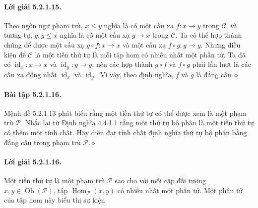 \paragraph{Lời giải 5.2.1.15.} Theo ngôn ngữ phạm trù, $x\leq y$ nghĩa là có một cấu xạ $f:x\to y$ trong $\mathcal C$, và tương tự, $g:y\leq x$ nghĩa là có một cấu xạ $y\to x$ trong $\mathcal C$. Ta có thể hợp thành chúng để được một cấu xạ $g\circ f:x\to x$ và một cấu xạ $f\circ g:y\to y$. Nhưng điều kiện để $\mathcal C$ là một tiền thứ tự là mỗi tập hom có nhiều nhất một phần tử. Ta đã có $\operatorname{id}_x:x\to x$ và $\operatorname{id}_y:y\to y$, nên các hợp thành $g\circ f$ và $f\circ g$ phải lần lượt là các cấu xạ đồng nhất $\operatorname{id}_x$ và $\operatorname{id}_y$. Vì vậy, theo định nghĩa, $f$ và $g$ là đẳng cấu.\hfill$\diamond$
\paragraph{Bài tập 5.2.1.16.} Mệnh đề 5.2.1.13 phát biểu rằng một tiền thứ tự có thể được xem là một phạm trù $\mathcal P$. Nhắc lại từ Định nghĩa 4.4.1.1 rằng một thứ tự bộ phận là một tiền thứ tự có thêm một tính chất. Hãy diễn đạt tính chất định nghĩa thứ tự bộ phận bằng đẳng cấu trong phạm trù $\mathcal P$.\hfill$\diamond$
\paragraph{Lời giải 5.2.1.16.} Một tiền thứ tự là một phạm trù $\mathcal P$ sao cho với mỗi cặp đối tượng $x,y\in\operatorname{Ob}(\mathcal P)$, tập $\operatorname{Hom}_{\mathcal P}(x,y)$ có nhiều nhất một phần tử. Một phần tử của tập hom này biểu thị sự kiện
